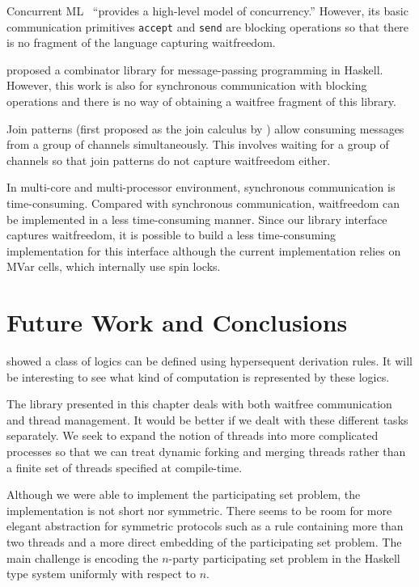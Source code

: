 Concurrent ML~\citep{concurrentML} ``provides a high-level model of
concurrency.''  However, its basic communication primitives
\texttt{accept} and \texttt{send} are blocking operations so that there
is no fragment of the language capturing waitfreedom.

\citet{Brown} proposed a combinator library for message-passing
programming in Haskell.  However, this work is also for synchronous
communication with blocking operations and there is no way of
obtaining a waitfree
fragment of this library.

Join patterns (first proposed as the join calculus by \citet{join}) allow
consuming messages from a group of
channels simultaneously.  This involves waiting for a group of channels
so that join patterns do not capture waitfreedom either.

In multi-core and multi-processor environment, synchronous communication
is time-consuming.  Compared with
synchronous communication, waitfreedom can be implemented in a less
time-consuming manner.  Since our library
interface captures waitfreedom, it is possible to build a less
time-consuming implementation for this interface although the current
implementation relies on MVar cells, which internally use spin locks.

\section{Future Work and Conclusions}

\citet*{alg} showed a class of logics can be defined using
hypersequent derivation rules.  It will be interesting to see what kind
of computation is represented by these logics.

The library presented in this chapter deals with both waitfree
communication and thread management.  It would be better if we dealt with
these different tasks separately.
We seek to expand the notion of threads into more complicated
processes so that we can treat dynamic forking and merging threads rather
than a finite set of threads specified at compile-time.

Although we were able to implement the participating set problem,
the implementation is not short nor symmetric.
There seems to be room for more elegant abstraction for symmetric
protocols such as
a rule containing more than two threads and a more direct embedding of the
participating set problem.  The main challenge is encoding the
$n$-party participating set problem in the Haskell type system uniformly
with respect to $n$.

